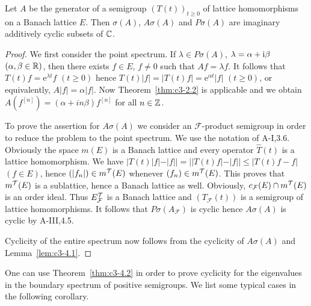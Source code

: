 \begin{theorem}\label{thm:c3-4.2}
	Let $A$ be the generator of a semigroup $(T(t))_{t \geq 0}$ of lattice homomorphisms on a Banach lattice $E$. 
	Then $\sigma(A)$, $A\sigma(A)$ and $P\sigma(A)$ are imaginary additively cyclic subsets of $\mathbb{C} $.
\end{theorem}

\begin{proof}
	We first consider the point spectrum. 
	If $\lambda \in P\sigma(A)$, $\lambda = \alpha + \mathrm{i}\beta$ $(\alpha,\beta \in \mathbb{R} )$, then there exists $f \in E$, $f \neq 0$ such that $Af = \lambda f$. 
	It follows that $T(t)f = \mathrm{e}^{\lambda t}f$ $(t \geq 0)$ hence $T(t)|f| = |T(t)f| = \mathrm{e}^{\alpha t}|f|$ $(t \geq 0)$, or equivalently, $A|f| = \alpha|f|$. 
	Now Theorem~\ref{thm:c3-2.2} is applicable and we obtain $A(f^{[n]}) = (\alpha + in\beta)f^{[n]}$ for all $n \in \mathbb{Z}$.
	
	To prove the assertion for $A\sigma(A)$ we consider an $\mathcal{F}$-product semigroup in order to reduce the problem to the point spectrum. 
	We use the notation of A-I,3.6. 
	Obviously the space $m(E)$ is a Banach lattice and every operator $\hat{T}(t)$ is a lattice homomorphism. 
	We have $|T(t)|f| - |f|| = ||T(t)f| - |f|| \leq |T(t)f - f|$ $(f \in E)$, hence $(|f_{n}|) \in m^{\mathcal{T}}(E)$ whenever $(f_{n}) \in m^{\mathcal{T}}(E)$. 
	This proves that $m^{\mathcal{T}}(E)$ is a sublattice, hence a Banach lattice as well. 
	Obviously, $c_{\mathcal{F}}(E)\cap m^{\mathcal{T}}(E)$ is an order ideal. 
	Thus $E_{\mathcal{F}}^{\mathcal{T}}$ is a Banach lattice and $(T_{\mathcal{F}}(t))$ is a semigroup of lattice homomorphisms. 
	It follows that $P\sigma(A_{\mathcal{F}})$ is cyclic hence $A\sigma(A)$ is cyclic by A-III,4.5.
	
	Cyclicity of the entire spectrum now follows from the cyclicity of $A\sigma(A)$ and Lemma~\ref{lem:c3-4.1}.
\end{proof}

One can use Theorem~\ref{thm:c3-4.2} in order to prove cyclicity for the eigenvalues in the boundary spectrum of positive semigroups. 
We list some typical cases in the following corollary.

